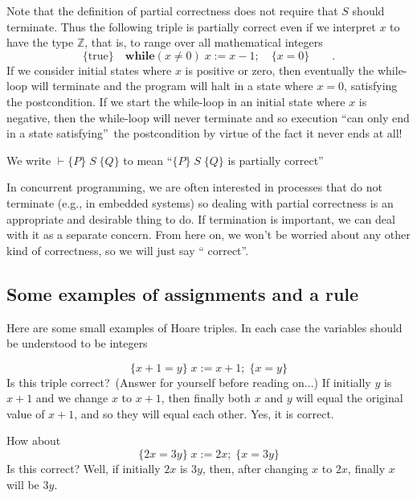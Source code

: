 \documentclass[11pt]{article}%
\begin{document}
Note that the definition of partial correctness does not require that $S$
should terminate. Thus the following triple is partially correct even if we
interpret $x$ to have the type $\mathbb{Z}$, that is, to range over all
mathematical integers%
\[
\{\mathrm{true}\}\quad\mathbf{while}(x\neq0)\;x:=x-1;\quad\{x=0\}\qquad
\text{.}%
\]
If we consider initial states where $x$ is positive or zero, then eventually
the while-loop will terminate and the program will halt in a state where
$x=0$, satisfying the postcondition. If we start the while-loop in an initial
state where $x$ is negative, then the while-loop will never terminate and so
execution \textquotedblleft can only end in a state
satisfying\textquotedblright\ the postcondition by virtue of the fact it never
ends at all!

We write $\vdash\{P\}\;S\;\{Q\}$ to mean \textquotedblleft$\{P\}\;S\;\{Q\}$ is
partially correct\textquotedblright

In concurrent programming, we are often interested in processes that do not
terminate (e.g., in embedded systems) so dealing with partial correctness is
an appropriate and desirable thing to do. If termination is important, we can
deal with it as a separate concern. From here on, we won't be worried about
any other kind of correctness, so we will just say \textquotedblleft
correct\textquotedblright.

\subsection{Some examples of assignments and a rule}

Here are some small examples of Hoare triples. In each case the variables
should be understood to be integers%

\[
\{x+1=y\}\;x:=x+1;\;\{x=y\}
\]
Is this triple correct?\ (Answer for yourself before reading on...) If
initially $y$ is $x+1$ and we change $x$ to $x+1$, then finally both $x$ and
$y$ will equal the original value of $x+1$, and so they will equal each other.
Yes, it is correct.

How about%
\[
\{2x=3y\}\;x:=2x;\;\{x=3y\}
\]
Is this correct? Well, if initially $2x$ is $3y$, then, after changing $x$ to
$2x$, finally $x$ will be $3y$.
\end{document}
